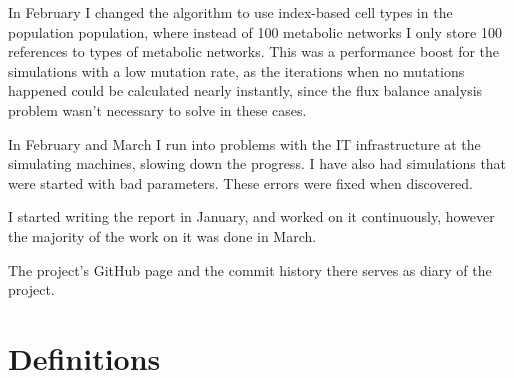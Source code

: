 \documentclass[a4paper,12pt]{article}
\begin{document}
	In February I changed the algorithm to use index-based cell types in the population population, where instead of 100 metabolic networks I only store 100 references to types of metabolic networks. This was a performance boost for the simulations with a low mutation rate, as the iterations when no mutations happened could be calculated nearly instantly, since the flux balance analysis problem wasn't necessary to solve in these cases. 

	In February and March I run into problems with the IT infrastructure at the simulating machines, slowing down the progress. I have also had simulations that were started with bad parameters. These errors were fixed when discovered. 

	I started writing the report in January, and worked on it continuously, however the majority of the work on it was done in March. 

	The project's GitHub page \cite{owngithub} and the commit history there serves as diary of the project. 
	\cleardoublepage
	\section*{Definitions}
\end{document}
